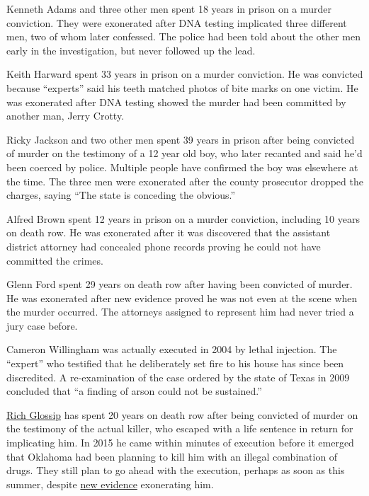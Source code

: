 \documentclass[12pt]{book}
\begin{document}
Kenneth Adams and three other men spent 18 years in prison on a murder
conviction. They were exonerated after DNA testing implicated three
different men, two of whom later confessed. The police had been told
about the other men early in the investigation, but never followed up
the lead.

Keith Harward spent 33 years in prison on a murder conviction. He was
convicted because ``experts'' said his teeth matched photos of bite
marks on one victim. He was exonerated after DNA testing showed the
murder had been committed by another man, Jerry Crotty.

Ricky Jackson and two other men spent 39 years in prison after being
convicted of murder on the testimony of a 12 year old boy, who later
recanted and said he'd been coerced by police. Multiple people have
confirmed the boy was elsewhere at the time. The three men were
exonerated after the county prosecutor dropped the charges, saying ``The
state is conceding the obvious.''

Alfred Brown spent 12 years in prison on a murder conviction, including
10 years on death row. He was exonerated after it was discovered that
the assistant district attorney had concealed phone records proving he
could not have committed the crimes.

Glenn Ford spent 29 years on death row after having been convicted of
murder. He was exonerated after new evidence proved he was not even at
the scene when the murder occurred. The attorneys assigned to represent
him had never tried a jury case before.

Cameron Willingham was actually executed in 2004 by lethal injection.
The ``expert'' who testified that he deliberately set fire to his house
has since been discredited. A re-examination of the case ordered by the
state of Texas in 2009 concluded that ``a finding of arson could not be
sustained.''

\href{https://saverichardglossip.com/facts}{Rich Glossip} has spent 20
years on death row after being convicted of murder on the testimony of
the actual killer, who escaped with a life sentence in return for
implicating him. In 2015 he came within minutes of execution before it
emerged that Oklahoma had been planning to kill him with an illegal
combination of drugs. They still plan to go ahead with the execution,
perhaps as soon as this summer, despite
\href{https://www.usnews.com/news/best-states/oklahoma/articles/2020-10-14/attorney-for-oklahoma-death-row-inmate-claims-new-evidence}{new
evidence} exonerating him.
\end{document}
